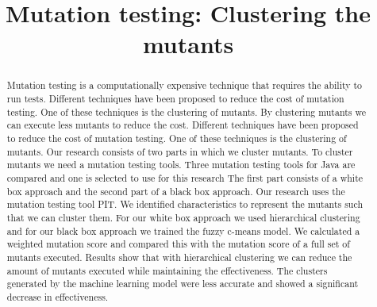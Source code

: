 \documentclass[conference]{IEEEtran}
\begin{document}
\title{Mutation testing: Clustering the mutants}


\author{

\and
{}
\and
{}
}

\maketitle
\begin{abstract}
Mutation testing is a computationally expensive technique that requires the ability to run tests.
Different techniques have been proposed to reduce the cost of mutation testing.
One of these techniques is the clustering of mutants.
By clustering mutants we can execute less mutants to reduce the cost.
Different techniques have been proposed to reduce the cost of mutation testing.
One of these techniques is the clustering of mutants.
Our research consists of two parts in which we cluster mutants.
To cluster mutants we need a mutation testing tools.
Three mutation testing tools for Java are compared and one is selected to use for this research
The first part consists of a white box approach and the second part of a black box approach.
Our research uses the mutation testing tool PIT.
We identified characteristics to represent the mutants such that we can cluster them.
For our white box approach we used hierarchical clustering and for our black box approach we trained the fuzzy c-means  model.
We calculated a weighted mutation score and compared this with the mutation score of a full set of mutants executed.
Results show that with hierarchical clustering we can reduce the amount of mutants executed while maintaining the effectiveness.
The clusters generated by the machine learning model were less accurate and showed a significant decrease in effectiveness.
\end{abstract}
\end{document}
